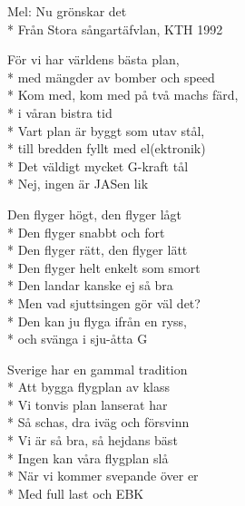 \begin{SongText}
    \begin{SongInfo}
        Mel: Nu grönskar det\\*%
        Från Stora sångartäfvlan, KTH 1992
    \end{SongInfo}
    \begin{SongVerse}
        För vi har världens bästa plan,\\*%
        med mängder av bomber och speed\\*%
        Kom med, kom med på två machs färd,\\*%
        i våran bistra tid\\*%
        Vart plan är byggt som utav stål,\\*%
        till bredden fyllt med el(ektronik)\\*%
        Det väldigt mycket G-kraft tål\\*%
        Nej, ingen är JASen lik
    \end{SongVerse}
    \begin{SongVerse}
        Den flyger högt, den flyger lågt\\*%
        Den flyger snabbt och fort\\*%
        Den flyger rätt, den flyger lätt\\*%
        Den flyger helt enkelt som smort\\*%
        Den landar kanske ej så bra\\*%
        Men vad sjuttsingen gör väl det?\\*%
        Den kan ju flyga ifrån en ryss,\\*%
        och svänga i sju-åtta G
    \end{SongVerse}
    \begin{SongVerse}
        Sverige har en gammal tradition\\*%
        Att bygga flygplan av klass\\*%
        Vi tonvis plan lanserat har\\*%
        Så schas, dra iväg och försvinn\\*%
        Vi är så bra, så hejdans bäst\\*%
        Ingen kan våra flygplan slå\\*%
        När vi kommer svepande över er\\*%
        Med full last och EBK
    \end{SongVerse}
\end{SongText}

